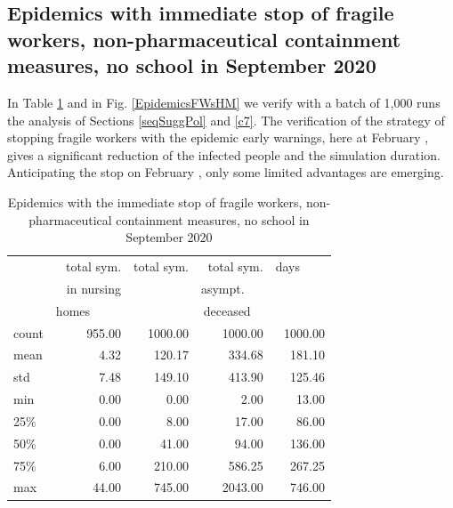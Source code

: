 \documentclass[11pt]{article}
\begin{document}
\subsection{Epidemics with immediate stop of fragile workers, non-pharmaceutical containment measures, no school in September 2020}
\label{EpidemicsFWsS}


In Table \ref{EpidemicsFWsT} and in Fig. \ref{EpidemicsFWsHM} we verify with a batch of 1,000 runs the analysis of Sections \ref{seqSuggPol} and \ref{c7}. The verification of the strategy of stopping fragile workers with the epidemic early warnings, here at February , gives a significant reduction of the infected people and the simulation duration. Anticipating the stop on February , only some limited advantages are emerging.

\begin{table}[H]
\center
\small
\begin{tabular}{lrrrr}
\toprule
{} & total sym.        &  total sym. & total sym.     & days~~~~ \\
{} & in nursing        &                  & asympt.~~~  & \\
{} & homes~~~~~  &                  & deceased~~ & \\
\midrule
count &     955.00 &             1000.00 &                 1000.00 & 1000.00 \\
mean  &       4.32 &              120.17 &                  334.68 &  181.10 \\
std   &       7.48 &              149.10 &                  413.90 &  125.46 \\
min   &       0.00 &                0.00 &                    2.00 &   13.00 \\
25\%   &       0.00 &                8.00 &                   17.00 &   86.00 \\
50\%   &       0.00 &               41.00 &                   94.00 &  136.00 \\
75\%   &       6.00 &              210.00 &                  586.25 &  267.25 \\
max   &      44.00 &              745.00 &                 2043.00 &  746.00 \\
\bottomrule
\end{tabular}

\label{EpidemicsFWsT}
\caption{Epidemics with the immediate stop of fragile workers, non-pharmaceutical containment measures, no school in September 2020}
\end{table}
\end{document}
